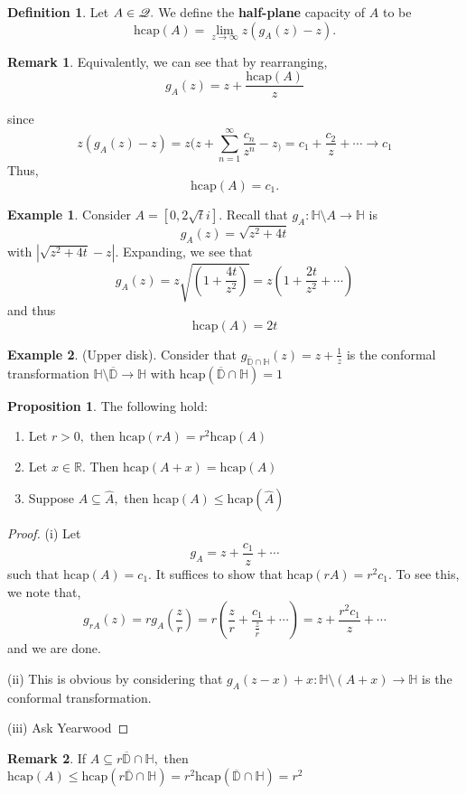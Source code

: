 \documentclass[10pt, oneside]{article}
\newcommand{\bbR}{\mathbb{R}}
\newcommand{\hcap}{\text{hcap}}
\newcommand{\sm}{\setminus}
\theoremstyle{definition}
\newtheorem{exmp}{Example}[section]
\newtheorem{defn}{Definition}
\newtheorem{prop}{Proposition}
\newtheorem{rem}{Remark}
\newcommand{\bbD}{\mathbb{D}}
\newcommand{\bbH}{\mathbb{H}}
\newcommand{\bbR}{\mathbb{R}}
\newcommand{\sm}{\setminus}
\begin{document}
\begin{defn}
    Let $A\in \cal Q.$ We define the \textbf{half-plane} capacity of $A$ to be 
    \[\hcap(A) = \lim_{z\to \infty} z(g_A(z) -z).\]
\end{defn}
\begin{rem}
    Equivalently, we can see that by rearranging, 
    \[g_A(z) =z + \frac{\hcap(A)}{z} \]
    
    
    since 
    \[z(g_A(z)-z) =z(z + \sum_{n=1}^\infty \frac{c_n}{z^n} -z_ ) = c_1 + \frac{c_2}{z} + \cdots \to c_1\] Thus, 
    \[\hcap(A) = c_1.\]
\end{rem}
\begin{exmp}
    Consider $A = [0, 2\sqrt{t}i].$ Recall that $g_A: \bbH \sm A \to \bbH$ is 
    \[g_A(z) = \sqrt{z^2 + 4t}\] with $|\sqrt{z^2 + 4t} - z|.$ Expanding, we see that 
    \[g_A(z) = z\sqrt{(1 + \frac{4t}{z^2})} = z(1 + \frac{2t}{z^2} + \cdots)\] and thus 
    \[\hcap(A) = 2t\]
\end{exmp}

\begin{exmp}
    (Upper disk). Consider that $g_{\overline{\bbD}\cap \bbH}(z) = z + \frac{1}{z}$ is the conformal transformation $\bbH\sm \overline{\bbD}\to \bbH$ with $\hcap (\overline{\bbD}\cap \bbH) = 1$
\end{exmp}
\begin{prop}
    The following hold:
    \begin{enumerate}
        \item Let $r>0,$ then $\hcap(rA) = r^2\hcap(A)$
        \item Let $x\in \bbR$. Then $\hcap(A + x) = \hcap (A)$
        \item Suppose $A\subseteq \hat A,$ then $\hcap(A) \leq \hcap (\hat A)$
    \end{enumerate}
\end{prop}
\begin{proof}
    (i) Let 
    \[g_A = z + \frac{c_1}{z} + \cdots \] such that $\hcap (A)= c_1.$ It suffices to show that $\hcap (rA) = r^2 c_1.$ To see this, we note that, 
    \[g_{rA}(z) = rg_A(\frac{z}{r}) = r(\frac{z}{r} + \frac{c_1}{\frac{z}{r}} + \cdots ) = z + \frac{r^2 c_1}{z} + \cdots\] and we are done.

    (ii) This is obvious by considering that $g_A(z - x) + x: \bbH \sm (A + x)\to \bbH$ is the conformal transformation. 

    (iii) Ask Yearwood
\end{proof}
\begin{rem}
    If $A\subseteq r\overline{\bbD} \cap \bbH,$ then $\hcap (A) \leq \hcap (r\overline{\bbD}\cap \bbH) = r^2 \hcap(\overline{\bbD}\cap \bbH) = r^2$
\end{rem}
\end{document}

